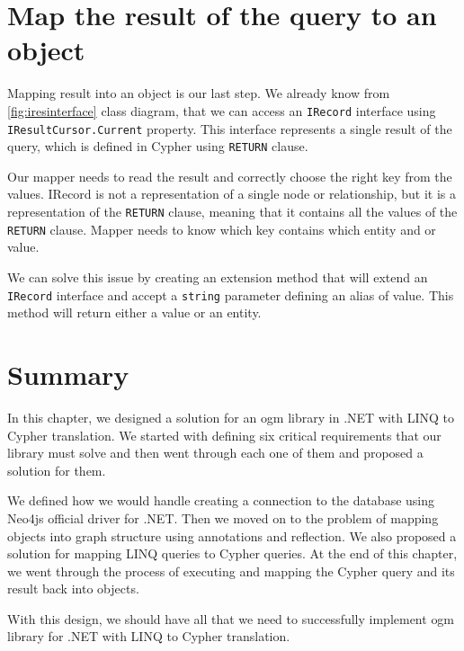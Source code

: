 \section{Map the result of the query to an object}

Mapping result into an object is our last step. We already know from \ref{fig:iresinterface} class diagram,
that we can access an \texttt{IRecord} interface using \texttt{IResultCursor.Current} property.
This interface represents a single result of the query, which is defined in Cypher using \texttt{RETURN} clause.

Our mapper needs to read the result and correctly choose the right key from the values. IRecord is not a representation of a single node or relationship, but it is a representation of the \texttt{RETURN} clause, meaning that it contains all the values of the \texttt{RETURN} clause.
Mapper needs to know which key contains which entity and or value.

We can solve this issue by creating an extension method that will extend an \texttt{IRecord} interface and accept a \texttt{string} parameter defining an alias of value.
This method will return either a value or an entity.

\section{Summary}

In this chapter, we designed a solution for an \acrshort{ogm} library in .NET with LINQ to Cypher translation.
We started with defining six critical requirements that our library must solve and then went through each one of them and
proposed a solution for them.

We defined how we would handle creating a connection to the database using Neo4js official driver for .NET. Then we moved on
to the problem of mapping objects into graph structure using annotations and reflection. We also proposed a solution for mapping LINQ queries to
Cypher queries. At the end of this chapter, we went through the process of executing and mapping the Cypher query and its result back into objects.

With this design, we should have all that we need to successfully implement \acrshort{ogm} library for .NET with LINQ to Cypher translation.
